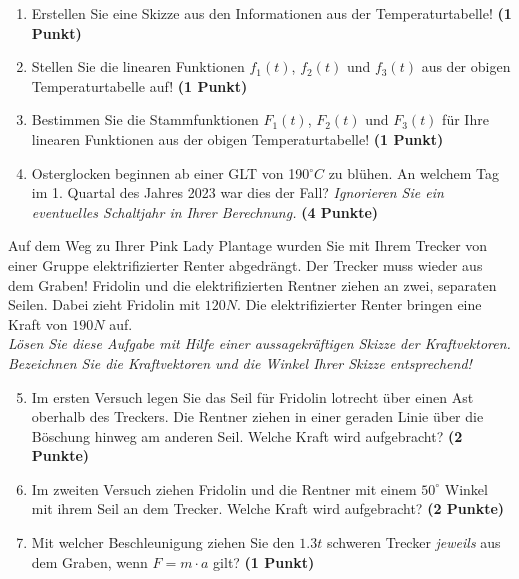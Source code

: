 \documentclass[a4paper, 9pt]{scrartcl}\usepackage[]{graphicx}\usepackage[]{xcolor}
\begin{document}
\begin{enumerate}
\item Erstellen Sie eine Skizze aus den Informationen aus der
  Temperaturtabelle!  \textbf{(1 Punkt)}
\item Stellen Sie die linearen Funktionen $f_1(t)$, $f_2(t)$ und
  $f_3(t)$ aus der obigen Temperaturtabelle auf!  \textbf{(1 Punkt)}
\item Bestimmen Sie die Stammfunktionen $F_1(t)$, $F_2(t)$ und $F_3(t)$ f{\"u}r
  Ihre linearen Funktionen aus der obigen Temperaturtabelle!  \textbf{(1
    Punkt)}
\item Osterglocken beginnen ab einer GLT von 190$^\circ C$ zu bl{\"u}hen. An
  welchem Tag im 1. Quartal des Jahres 2023 war dies der
  Fall? \textit{Ignorieren Sie ein eventuelles Schaltjahr in Ihrer Berechnung.} \textbf{(4 Punkte)}
\end{enumerate}

Auf dem Weg zu Ihrer Pink Lady Plantage wurden Sie mit Ihrem Trecker von
einer Gruppe elektrifizierter Renter abgedr{\"a}ngt. Der Trecker muss wieder
aus dem Graben! Fridolin und die elektrifizierten Rentner ziehen an zwei,
separaten Seilen. Dabei zieht Fridolin mit $120N$. Die
elektrifizierter Renter  bringen eine Kraft von $190N$ auf.\\

\textit{L{\"o}sen Sie diese Aufgabe mit Hilfe einer aussagekr{\"a}ftigen Skizze der
  Kraftvektoren. Bezeichnen Sie die Kraftvektoren und die Winkel Ihrer
  Skizze entsprechend!}

\begin{enumerate}
  \setcounter{enumi}{4}  
\item Im ersten Versuch legen Sie das Seil f{\"u}r Fridolin lotrecht {\"u}ber einen
  Ast oberhalb des Treckers. Die Rentner ziehen in einer geraden Linie {\"u}ber
  die B{\"o}schung hinweg am anderen Seil. Welche Kraft wird aufgebracht?
  \textbf{(2 Punkte)}
\item Im zweiten Versuch ziehen Fridolin und die Rentner mit einem
  $50^\circ$ Winkel mit ihrem Seil an dem Trecker. Welche Kraft
  wird aufgebracht? \textbf{(2 Punkte)}
\item Mit welcher Beschleunigung ziehen Sie den $1.3t$ schweren
  Trecker \textit{jeweils} aus dem Graben, wenn $F = m \cdot a$ gilt?
  \textbf{(1 Punkt)}
\end{enumerate}

 
\clearpage
\end{document}
